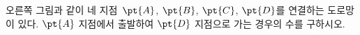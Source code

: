 \noindent\begin{minipage}[t]{0.58\linewidth}\vspace{0pt}\raggedright 오른쪽 그림과 같이 네 지점~$\pt{A}$, $\pt{B}$, $\pt{C}$, $\pt{D}$를 연결하는 도로망이 있다. $\pt{A}$ 지점에서 출발하여 $\pt{D}$ 지점으로 가는 경우의 수를 구하시오. \end{minipage}\hfill\begin{minipage}[t]{0.4\linewidth}\vspace{0pt}\centering \resizebox{\ifdim\width>\linewidth\linewidth\else\width\fi}{!}{}\end{minipage}\par
